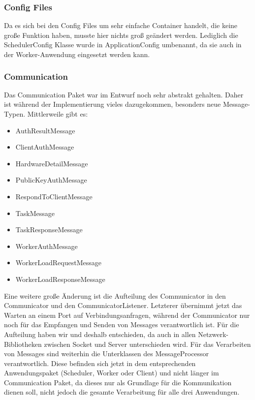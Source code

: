 \documentclass[a4paper,12pt]{article}
\begin{document}
\subsubsection{Config Files}
\vspace{0.2cm}
Da es sich bei den Config Files um sehr einfache Container handelt, die keine große Funktion haben, musste hier nichts groß geändert werden. Lediglich die SchedulerConfig Klasse wurde in ApplicationConfig umbenannt, da sie auch in der Worker-Anwendung eingesetzt werden kann. 

\subsubsection{Communication}
\vspace{0.2cm}
Das Communication Paket war im Entwurf noch sehr abstrakt gehalten. Daher ist während der Implementierung vieles dazugekommen, besonders neue Message-Typen. Mittlerweile gibt es:
\begin{itemize}
	\item AuthResultMessage
	\item ClientAuthMessage
	\item HardwareDetailMessage
	\item PublicKeyAuthMessage
	\item RespondToClientMessage
	\item TaskMessage
	\item TaskResponseMessage
	\item WorkerAuthMessage
	\item WorkerLoadRequestMessage
	\item WorkerLoadResponseMessage
\end{itemize}
Eine weitere große Änderung ist die Aufteilung des Communicator in den Communicator und den CommunicatorListener. Letzterer übernimmt jetzt das Warten an einem Port auf Verbindungsanfragen, während der Communicator nur noch für das Empfangen und Senden von Messages verantwortlich ist. Für die Aufteilung haben wir und deshalb entschieden, da auch in allen Netzwerk-Bibliotheken zwischen Socket und Server unterschieden wird. Für das Verarbeiten von Messages sind weiterhin die Unterklassen des MessageProcessor verantwortlich. Diese befinden sich jetzt in dem entsprechenden Anwendungspaket (Scheduler, Worker oder Client) und nicht länger im Communication Paket, da dieses nur als Grundlage für die Kommunikation dienen soll, nicht jedoch die gesamte Verarbeitung für alle drei Anwendungen.
\end{document}
